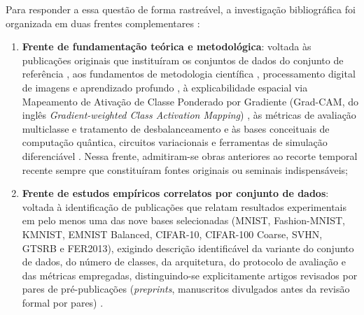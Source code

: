 \documentclass[
    12pt,
    openright,
    oneside,
    a4paper,
    english,
    brazil
]{abntex2}
\begin{document}
Para responder a essa questão de forma rastreável, a investigação bibliográfica foi organizada em duas frentes complementares \cite{Wazlawick2020}:
\begin{enumerate}
    \item \textbf{Frente de fundamentação teórica e metodológica}: voltada às publicações originais que instituíram os conjuntos de dados do conjunto de referência \cite{lecun1998gradient,xiao2017fashionmnist,clanuwat2018kmnist,cohen2017emnist,krizhevsky2009learning,netzer2011svhn,stallkamp2012gtsrb,goodfellow2013fer2013}, aos fundamentos de metodologia científica \cite{Wazlawick2020}, processamento digital de imagens e aprendizado profundo \cite{gonzalez2008digital,szeliski2022computer,nair2010relu,he2015prelu,LeCun2015,goodfellow2016deep,szegedy2014going,he2016resnet,huang2017densenet,deisenroth2020mathematics}, à explicabilidade espacial via Mapeamento de Ativação de Classe Ponderado por Gradiente (Grad-CAM, do inglês \textit{Gradient-weighted Class Activation Mapping}) \cite{selvaraju2020gradcam}, às métricas de avaliação multiclasse e tratamento de desbalanceamento \cite{hand2001simple,fawcett2006roc,silva2025balanceamento} e às bases conceituais de computação quântica, circuitos variacionais e ferramentas de simulação diferenciável \cite{nielsen2010quantum,biamonte2017qml,preskill2018nisq,mcclean2018barren,bergholm2018pennylane,havlicek2019supervised,perezsalinas2020data,schuld2021effect,cerezo2021variational,faj2023warpspeed,bayraktar2023cuquantum,chen2024quantumhpcworkflow}. Nessa frente, admitiram-se obras anteriores ao recorte temporal recente sempre que constituíram fontes originais ou seminais indispensáveis;
    \item \textbf{Frente de estudos empíricos correlatos por conjunto de dados}: voltada à identificação de publicações que relatam resultados experimentais em pelo menos uma das nove bases selecionadas (MNIST, Fashion-MNIST, KMNIST, EMNIST Balanced, CIFAR-10, CIFAR-100 Coarse, SVHN, GTSRB e FER2013), exigindo descrição identificável da variante do conjunto de dados, do número de classes, da arquitetura, do protocolo de avaliação e das métricas empregadas, distinguindo-se explicitamente artigos revisados por pares de pré-publicações (\textit{preprints}, manuscritos divulgados antes da revisão formal por pares) \cite{Wazlawick2020}.
\end{enumerate}
\end{document}
